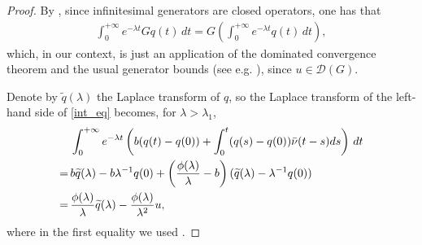 \documentclass[reqno]{amsart}
\theoremstyle{remark}
\numberwithin{equation}{section} %
\newcommand{\DD}{\mathcal{D}}
\newcommand{\1}{\mathds{1}}
\begin{document}
\begin{proof}
		By \cite[Proposition 3.7.12]{hille1996functional}, since infinitesimal generators are closed operators, one has that
		\begin{align}\label{GenLap}
			\int_0^{+\infty} e^{-\lambda t}   Gq(t)  \, dt =G\left(\int_0^{+\infty} e^{-\lambda t}  q(t)  \, dt\right),
		\end{align}
		which, in our context, is just an application of the dominated convergence theorem and the usual generator bounds (see e.g. \cite[Eq. (15.3)]{bernstein}), since $u\in \DD(G)$.
		
		
		
		Denote by $\widetilde{q}(\lambda)$ the Laplace transform of $q$, so the Laplace transform of the left-hand side of \eqref{int_eq} becomes, {for $\lambda > \lambda_1$,}
		\begin{align}
			&   \int_0^{+\infty} e^{-\lambda t} \left(  b(q(t)-q(0))+   \int_0^t (q(s)-q(0)) \bar{\nu}(t-s)ds \right) \, dt \notag \\  = \,& b \widetilde{q}(\lambda) -b\lambda^{-1}q(0)+ \left( \frac{\phi(\lambda)}{\lambda}-b \right) (\widetilde{q}(\lambda) - \lambda^{-1}q(0)) \notag \\
			= \, & \frac{\phi(\lambda)}{\lambda}  \widetilde{q}(\lambda)- \frac{\phi(\lambda)}{\lambda^2} u, 
			\label{326}
		\end{align}
		where in the first equality we used \cite[Proposition 1.6.4]{arendt2001cauchy}.
		

\end{proof}
\end{document}

